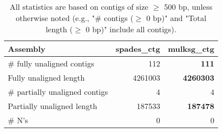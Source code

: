 \documentclass[12pt,a4paper]{article}
\begin{document}
\begin{table}[ht]
\begin{center}
\caption{All statistics are based on contigs of size $\geq$ 500 bp, unless otherwise noted (e.g., "\# contigs ($\geq$ 0 bp)" and "Total length ($\geq$ 0 bp)" include all contigs).}
\begin{tabular}{|l*{2}{|r}|}
\hline
Assembly & spades\_ctg & mulksg\_ctg \\ \hline
\# fully unaligned contigs & 112 & {\bf 111} \\ \hline
Fully unaligned length & 4261003 & {\bf 4260303} \\ \hline
\# partially unaligned contigs & 4 & 4 \\ \hline
Partially unaligned length & 187533 & {\bf 187478} \\ \hline
\# N's & 0 & 0 \\ \hline
\end{tabular}
\end{center}
\end{table}
\end{document}
